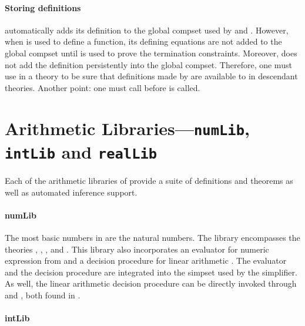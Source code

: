 {\paragraph{Storing definitions}

 automatically adds its definition to the global compset
used by  and . However, when  is
used to define a function, its defining equations are not added to the
global compset until  is used to prove the termination
constraints.  Moreover,  does not add the definition
persistently into the global compset. Therefore, one must use
 in a theory to be sure that definitions
made by  are available to  in descendant
theories.  Another point: one must call 
before  is called.


\section{Arithmetic Libraries---\texttt{numLib}, \texttt{intLib} and \texttt{realLib}}
\label{sec:numLib}

Each of the arithmetic libraries of \HOL{} provide a
suite of definitions and theorems as well as automated inference support.

\paragraph{numLib}

The most basic numbers in \HOL{} are the natural numbers. The
 library encompasses the theories ,
, , and .
This library also incorporates an evaluator for numeric expression
from  and a decision procedure for linear arithmetic
. The evaluator and the decision procedure are
integrated into the simpset  used by the simplifier.
As well, the linear arithmetic decision procedure can be directly
invoked through  and , both found in
.


\paragraph{intLib}

}
